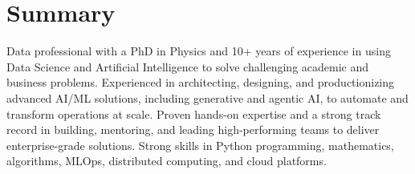 \documentclass[10pt,a4paper,sans]{moderncv}        %
\begin{document}
\makecvtitle


\section{Summary}

Data professional with a PhD in Physics and 10+ years of experience in using Data Science and Artificial Intelligence to solve challenging academic and business problems.\newline{}
Experienced in architecting, designing, and productionizing advanced AI/ML solutions, including generative and agentic AI, to automate and transform operations at scale. Proven hands-on expertise and a strong track record in building, mentoring, and leading high-performing teams to deliver enterprise-grade solutions.
\newline{}
Strong skills in Python programming, mathematics, algorithms, MLOps, distributed computing, and cloud platforms.

\vspace{0.5em}
\end{document}
